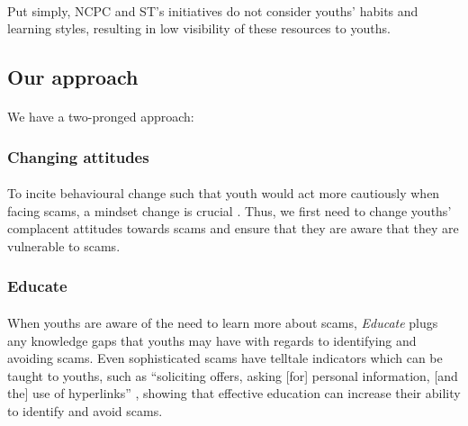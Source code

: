 \documentclass[a4paper]{article}
\begin{document}
\paragraph{} Put simply, NCPC and ST's initiatives do not consider youths'
habits and learning styles, resulting in low visibility of these resources to
youths.

\subsection{Our approach}
\paragraph{} We have a two-pronged approach:

\subsubsection{Changing attitudes}
\paragraph{} To incite behavioural change such that youth would act more
cautiously when facing scams, a mindset change is crucial
\parencite{ConnorBernal.2020}. Thus, we first need to change youths’ complacent
attitudes towards scams and ensure that they are aware that they are vulnerable
to scams.

\subsubsection{Educate}
\paragraph{} When youths are aware of the need to learn more about scams,
\emph{Educate} plugs any knowledge gaps that youths may have with regards to
identifying and avoiding scams. Even sophisticated scams have telltale
indicators which can be taught to youths, such as ``soliciting offers, asking
[for] personal information, [and the] use of hyperlinks''
\parencite{DatarColeRogers.2014}, showing that effective education can increase
their ability to identify and avoid scams.

\newpage
\end{document}

